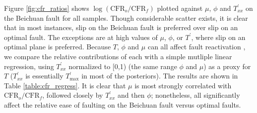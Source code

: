 \documentclass[twocolumn,jgrga]{AGUTeX}
\begin{document}
\begin{article}
{Figure \ref{fig:cfr_ratios} shows
$\log (\mathrm{CFR}_o / \mathrm{CFR}_f)$ plotted against $\mu$, $\phi$
and $T^\prime_{xx}$ on the Beichuan fault for all samples. Though
considerable scatter exists, it is clear that in most instances, slip on
the Beichuan fault is preferred over slip on an optimal fault. The
exceptions are at high values of $\mu$, $\phi$, or $T^\prime$, where
slip on an optimal plane is preferred. Because $T$, $\phi$ and $\mu$ can
all affect fault reactivation \citep[e.g.,][]{sibson1985}, we compare the
relative contributions of each with a simple mutliple linear regression,
using $T^\prime_{xx}$ normalized to [0,1) (the same range $\phi$ and
$\mu$) as a proxy for $T$ ($T^\prime_{xx}$ is essentially
$T^\prime_{\mathrm{max}}$ in most of the posteriors). The results are
shown in Table \ref{table:cfr_regress}. It is clear that $\mu$ is most
strongly correlated with $\mathrm{CFR}_o/\mathrm{CFR}_f$, followed
closely by $T^\prime_{xx}$ and then $\phi$; nonetheless, all
significantly affect the relative ease of faulting on the Beichuan fault
versus optimal faults.

}
\end{article}
\end{document}
